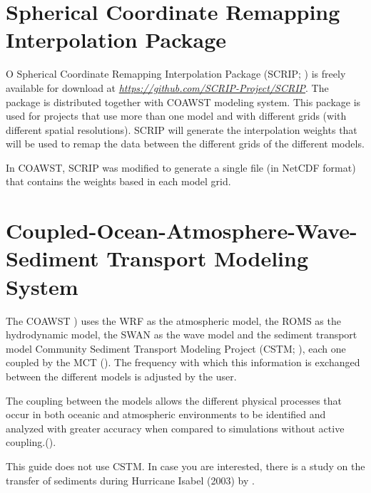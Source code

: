 \section{Spherical Coordinate Remapping Interpolation Package}\label{scripsecao}
\bigskip

\noindent O  Spherical Coordinate Remapping Interpolation Package (SCRIP; \cite{Jones1999,Jones1998}) is freely available for download at \textcolor{bleu_cite}{\href{https://github.com/SCRIP-Project/SCRIP}{\textit{https://github.com/SCRIP-Project/SCRIP}}}.    
The package is distributed together with COAWST modeling system. This package is used for projects that use more than one model and with different grids (with different spatial resolutions). SCRIP will generate the interpolation weights that will be
used to remap the data between the different grids of the different models.
\bigskip

\noindent In COAWST, SCRIP was modified to generate a single file (in NetCDF format) that contains the weights based in each model grid.
\bigskip

\section{Coupled-Ocean-Atmosphere-Wave-Sediment Transport Modeling System}\label{coawstsecao}
\bigskip
\noindent The COAWST \cite{Warner2010,Warner2008}) uses the WRF as the atmospheric model, the ROMS as the hydrodynamic model, the SWAN as the wave model and the sediment transport model
Community Sediment Transport Modeling Project (CSTM; \cite{Warner2008}), each one coupled by the MCT (\cite{Warner2010, Warner2008}). The frequency with which this information is
exchanged between the different models is adjusted by the user.
\bigskip

\noindent The coupling between the models allows the different physical processes that occur in both oceanic and atmospheric environments to be identified and analyzed with greater accuracy 
when compared to simulations without active coupling.(\cite{Pullen2018, Miller2018}).
\bigskip

\begin{tcolorbox}[enhanced,
  grow to left by   = 0cm,
  grow to right by  = 0cm,
  enlarge top by    = 0cm,
  enlarge bottom by = 0cm,
  tcbox raise base,
  boxrule           = 1.0pt,
  left              = 18mm,
  colframe          = red!50!black,coltext=red!25!black,colback=red!10!white,
  overlay           = {\begin{tcbclipinterior}\fill[red!75!blue!50!white] (frame.south west)
    rectangle node[text=white,font=\sffamily\bfseries\footnotesize,rotate=0] {WARNING} ([xshift=18mm]frame.north west);\end{tcbclipinterior}}]
    This guide does not use CSTM. In case you are interested, there is a study on the transfer of sediments during Hurricane Isabel (2003) by \textcite{Warner2010}.
\end{tcolorbox}
\bigskip


